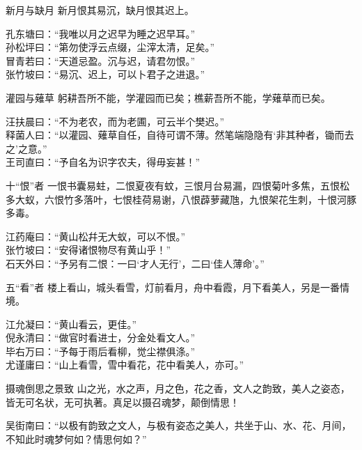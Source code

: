 \begin{yulu}{新月与缺月}
新月恨其易沉，缺月恨其迟上。
\begin{comments}
孔东塘曰：“我唯以月之迟早为睡之迟早耳。” \\
孙松坪曰：“第勿使浮云点缀，尘滓太清，足矣。” \\
冒青若曰：“天道忌盈。沉与迟，请君勿恨。” \\
张竹坡曰：“易沉、迟上，可以卜君子之进退。”
\end{comments}
\end{yulu}

\begin{yulu}{灌园与薙草}
躬耕吾所不能，学灌园而已矣；樵薪吾所不能，学薙草而已矣。
\begin{comments}
汪扶晨曰：“不为老农，而为老圃，可云半个樊迟。” \\
释菌人曰：“以灌园、薙草自任，自待可谓不薄。然笔端隐隐有‘非其种者，锄而去之’之意。” \\
王司直曰：“予自名为识字农夫，得毋妄甚！”
\end{comments}
\end{yulu}

\begin{yulu}{十“恨”者}
一恨书囊易蛀，二恨夏夜有蚊，三恨月台易漏，四恨菊叶多焦，五恨松多大蚁，六恨竹多落叶，七恨桂荷易谢，八恨薜萝藏虺，九恨架花生刺，十恨河豚多毒。
\begin{comments}
江药庵曰：“黄山松幷无大蚁，可以不恨。” \\
张竹坡曰：“安得诸恨物尽有黄山乎！” \\
石天外曰：“予另有二恨：一曰‘才人无行’，二曰‘佳人薄命’。”
\end{comments}
\end{yulu}

\begin{yulu}{五“看”者}
楼上看山，城头看雪，灯前看月，舟中看霞，月下看美人，另是一番情境。
\begin{comments}
江允凝曰：“黄山看云，更佳。” \\
倪永清曰：“做官时看进士，分金处看文人。” \\
毕右万曰：“予每于雨后看柳，觉尘襟俱涤。” \\
尤谨庸曰：“山上看雪，雪中看花，花中看美人，亦可。”
\end{comments}
\end{yulu}

\begin{yulu}{摄魂倒思之景致}
山之光，水之声，月之色，花之香，文人之韵致，美人之姿态，皆无可名状，无可执著。真足以摄召魂梦，颠倒情思！
\begin{comments}
吴街南曰：“以极有韵致之文人，与极有姿态之美人，共坐于山、水、花、月间，不知此时魂梦何如？情思何如？”
\end{comments}
\end{yulu}

